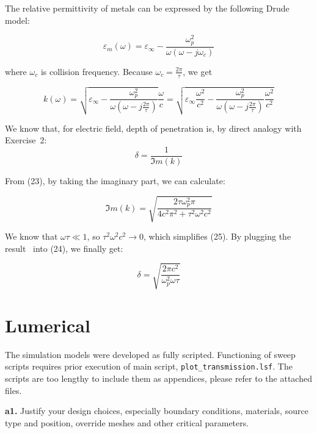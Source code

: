 \documentclass[11pt,a4paper]{article}
\begin{document}
The relative permittivity of metals can be expressed by the following Drude model:

\begin{equation}
    \varepsilon_m(\omega) = \varepsilon_{\infty}-\frac{\omega_p^2}{\omega(\omega - j \omega_c)}
\end{equation}

where $\omega_c$ is collision frequency. Because $\omega_c = \frac{2 \pi}{\tau}$, we get

\begin{equation}
    k (\omega) = \sqrt{\varepsilon_{\infty}-\frac{\omega_p^2}{\omega(\omega - j \frac{2 \pi}{\tau})}}\frac{\omega}{c} = \sqrt{\varepsilon_{\infty}\frac{\omega^2}{c^2}-\frac{\omega_p^2}{\omega(\omega - j \frac{2 \pi}{\tau})}\frac{\omega^2}{c^2}}
\end{equation}

We know that, for electric field, depth of penetration is, by direct analogy with Exercise~2: 
\begin{equation}
    \delta=\frac{1}{\Im m (k)}
\end{equation}

From (23), by taking the imaginary part, we can calculate:

\begin{equation}
    \Im m (k)= \sqrt{\frac{2 \tau \omega_p^2 \pi}{4 c^2 \pi^2 + \tau^2 \omega^2 c^2}}
\end{equation}

We know that $\omega \tau \ll 1$, so $\tau^2 \omega^2 c^2 \rightarrow 0$, which simplifies (25). By plugging the result  into (24), we finally get:

\begin{equation}
    \delta = \sqrt{\frac{2 \pi c^2}{\omega_p^2 \omega \tau}}
\end{equation}

\section{Lumerical}
The simulation models were developed as fully scripted. Functioning of sweep scripts requires prior execution of main script, \verb|plot_transmission.lsf|. The scripts are too lengthy to include them as appendices, please refer to the attached files. 

\begin{displayquote}
    \textbf{a1.} Justify your design choices, especially boundary conditions, materials, source type and position, override meshes and other critical parameters.
\end{displayquote}
\end{document}
